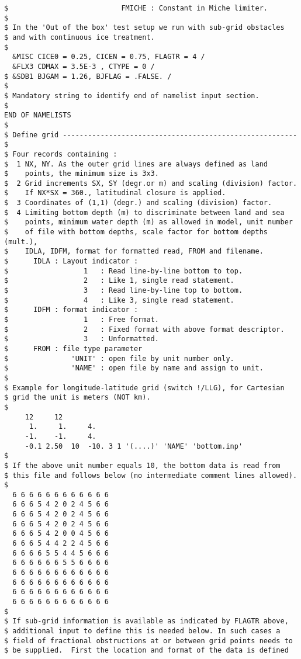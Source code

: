 \begin{verbatim}
$                           FMICHE : Constant in Miche limiter.
$
$ In the 'Out of the box' test setup we run with sub-grid obstacles
$ and with continuous ice treatment.
$
  &MISC CICE0 = 0.25, CICEN = 0.75, FLAGTR = 4 /
  &FLX3 CDMAX = 3.5E-3 , CTYPE = 0 /
$ &SDB1 BJGAM = 1.26, BJFLAG = .FALSE. /
$
$ Mandatory string to identify end of namelist input section.
$
END OF NAMELISTS
$
$ Define grid -------------------------------------------------------- $
$ Four records containing :
$  1 NX, NY. As the outer grid lines are always defined as land
$    points, the minimum size is 3x3.
$  2 Grid increments SX, SY (degr.or m) and scaling (division) factor.
$    If NX*SX = 360., latitudinal closure is applied.
$  3 Coordinates of (1,1) (degr.) and scaling (division) factor.
$  4 Limiting bottom depth (m) to discriminate between land and sea
$    points, minimum water depth (m) as allowed in model, unit number
$    of file with bottom depths, scale factor for bottom depths (mult.),
$    IDLA, IDFM, format for formatted read, FROM and filename.
$      IDLA : Layout indicator :
$                  1   : Read line-by-line bottom to top.
$                  2   : Like 1, single read statement.
$                  3   : Read line-by-line top to bottom.
$                  4   : Like 3, single read statement.
$      IDFM : format indicator :
$                  1   : Free format.
$                  2   : Fixed format with above format descriptor.
$                  3   : Unformatted.
$      FROM : file type parameter
$               'UNIT' : open file by unit number only.
$               'NAME' : open file by name and assign to unit.
$
$ Example for longitude-latitude grid (switch !/LLG), for Cartesian
$ grid the unit is meters (NOT km).
$
     12     12
      1.     1.     4.
     -1.    -1.     4.
     -0.1 2.50  10  -10. 3 1 '(....)' 'NAME' 'bottom.inp'
$
$ If the above unit number equals 10, the bottom data is read from
$ this file and follows below (no intermediate comment lines allowed).
$
  6 6 6 6 6 6 6 6 6 6 6 6
  6 6 6 5 4 2 0 2 4 5 6 6
  6 6 6 5 4 2 0 2 4 5 6 6
  6 6 6 5 4 2 0 2 4 5 6 6
  6 6 6 5 4 2 0 0 4 5 6 6
  6 6 6 5 4 4 2 2 4 5 6 6
  6 6 6 6 5 5 4 4 5 6 6 6
  6 6 6 6 6 6 5 5 6 6 6 6
  6 6 6 6 6 6 6 6 6 6 6 6
  6 6 6 6 6 6 6 6 6 6 6 6
  6 6 6 6 6 6 6 6 6 6 6 6
  6 6 6 6 6 6 6 6 6 6 6 6
$
$ If sub-grid information is available as indicated by FLAGTR above,
$ additional input to define this is needed below. In such cases a
$ field of fractional obstructions at or between grid points needs to
$ be supplied.  First the location and format of the data is defined

\end{verbatim}
